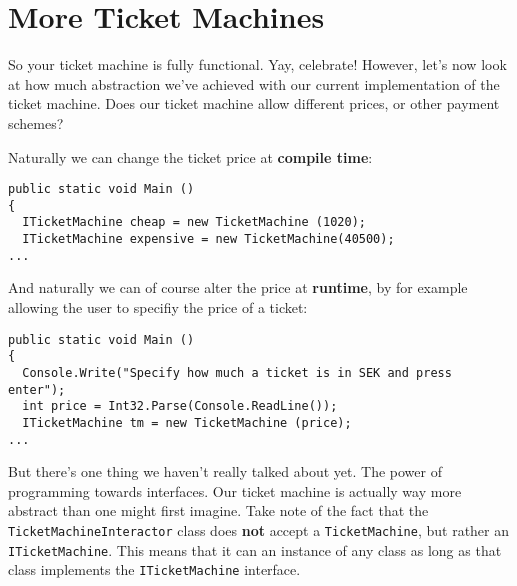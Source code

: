 \documentclass{article}
\begin{document}
\pagebreak
\section{More Ticket Machines}
So your ticket machine is fully functional. Yay, celebrate! However, let’s now look at how much abstraction we've achieved with our current implementation of the ticket machine. Does our ticket machine allow different prices, or other payment schemes?

Naturally we can change the ticket price at \textbf{compile time}:
\begin{lstlisting}
public static void Main ()
{ 
  ITicketMachine cheap = new TicketMachine (1020);
  ITicketMachine expensive = new TicketMachine(40500);
...
\end{lstlisting}
And naturally we can of course alter the price at \textbf{runtime}, by for example allowing the user to specifiy the price of a ticket:
\begin{lstlisting}
public static void Main ()
{ 
  Console.Write("Specify how much a ticket is in SEK and press enter");
  int price = Int32.Parse(Console.ReadLine());
  ITicketMachine tm = new TicketMachine (price);
...
\end{lstlisting}
But there's one thing we haven't really talked about yet. The power of programming towards interfaces. Our ticket machine is actually way more abstract than one might first imagine. Take note of the fact that the \texttt{TicketMachineInteractor} class does \textbf{not} accept a \texttt{TicketMachine}, but rather an \texttt{ITicketMachine}. This means that it can an instance of any class as long as that class implements the \texttt{ITicketMachine} interface.
\end{document}
